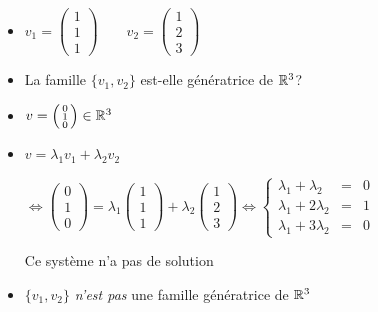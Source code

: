 \begin{frame}
\begin{exemple}
\begin{itemize}
\item
$v_1=\left(\begin{smallmatrix}1\\1\\1\end{smallmatrix}\right)\qquad
v_2=\left(\begin{smallmatrix}1\\2\\3\end{smallmatrix}\right)$

\pause
\item 
La famille $\{v_1, v_2\}$ est-elle g\'en\'eratrice de $\mathbb{R}^3$?

\pause
\item
$v=\left(\begin{smallmatrix}0\\1\\0\end{smallmatrix}\right)\in\mathbb{R}^3$%

\pause
\item

$v=\lambda_1 v_1 + \lambda_2 v_2$

\pause
$\iff\left(\begin{smallmatrix}0\\1\\0\end{smallmatrix}\right)= 
\lambda_1 \left(\begin{smallmatrix}1\\1\\1\end{smallmatrix}\right) + 
\lambda_2 \left(\begin{smallmatrix}1\\2\\3\end{smallmatrix}\right)
\iff
\left\{\begin{array}{rcl} 
\lambda_1 + \lambda_2 & = & 0\\
\lambda_1 + 2\lambda_2 & = & 1\\
\lambda_1 + 3\lambda_2 & = & 0
\end{array}\right.
$

\pause
Ce système n'a {\color{red}pas} de solution

\pause
\item
$\{v_1, v_2\}$ \emph{n'est pas} une famille g\'en\'eratrice de $\mathbb{R}^3$ 
\end{itemize}
\end{exemple}
\end{frame}



